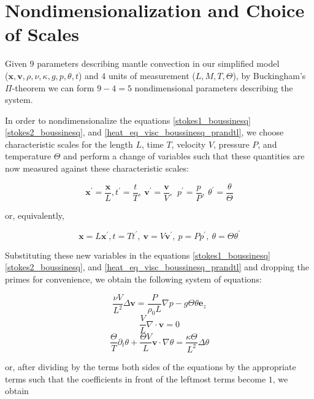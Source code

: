 \documentclass[
10pt, %
a4paper, %
oneside, %
headinclude,footinclude, %
BCOR5mm, %
]{scrartcl}
\providecommand{\divergence}{\nabla\cdot}
\providecommand{\velocity}{\mathbf{v}}
\providecommand{\surfaceNormal}{\mathbf{e}_z}
\providecommand{\pressGrad}{\nabla p}
\providecommand{\laplacianVel}{\Delta\velocity}
\providecommand{\partialTimeTemp}{\partial_t\theta}
\providecommand{\inertTermTemp}{\velocity\cdot\nabla\theta}
\providecommand{\laplacianTemp}{\Delta\theta}
\providecommand{\velocityNondim}{\mathbf{v^{\prime}}}
\begin{document}
\section{Nondimensionalization and Choice of Scales}

Given $9$ parameters describing mantle convection in our simplified model \\ ($\mathbf{x}, \velocity, \rho, \nu, \kappa, g, p, \theta, t$) and $4$ units of measurement ($L, M, T, \Theta$), by Buckingham's $\Pi$-theorem we can form $9 - 4 = 5$ nondimensional parameters describing the system. \cite{barenblatt1} %

In order to nondimensionalize the equations \ref{stokes1_boussinesq} \ref{stokes2_boussinesq}, and \ref{heat_eq_visc_boussinesq_prandtl}, we choose characteristic scales for the length $L$, time $T$, velocity $V$, pressure $P$, and temperature $\Theta$ and perform a change of variables such that these quantities are now measured against these characteristic scales:

$$ \mathbf{x^{\prime}} = \frac{\mathbf{x}}{L}, t^{\prime} = \frac{t}{T},~ \velocityNondim = \frac{\velocity}{V},~ ~ p^{\prime} = \frac{p}{P}, ~\theta^{\prime} = \frac{\theta}{\Theta} $$  

or, equivalently,

$$ \mathbf{x} = L \mathbf{x^{\prime}}, t = T t^{\prime},~ \velocity = V \velocityNondim,~ p = P p^{\prime}, ~ \theta = \Theta \theta^{\prime} $$ 

Substituting these new variables in the equations \ref{stokes1_boussinesq} \ref{stokes2_boussinesq}, and \ref{heat_eq_visc_boussinesq_prandtl} and dropping the primes for convenience, we obtain the following system of equations:

\begin{equation}
\frac{\nu V}{L^2} \laplacianVel = \frac{P}{\rho_0 L}\pressGrad - g \Theta \theta \surfaceNormal
\end{equation}
\begin{equation}
\frac{V}{L} \divergence \velocity = 0
\end{equation}
\begin{equation}
\frac{\Theta}{T} \partialTimeTemp + \frac{\Theta V}{L} \inertTermTemp = \frac{\kappa \Theta}{L^2} \laplacianTemp  
\end{equation} 

or, after dividing by the terms both sides of the equations by the appropriate terms such that the coefficients in front of the leftmost terms become $1$, we obtain
\end{document}
